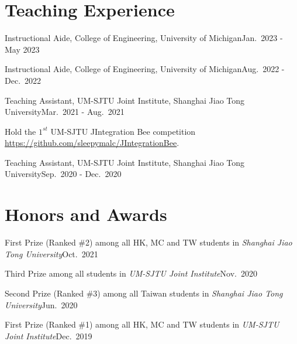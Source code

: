 \documentclass[letterpaper,10.8pt]{article}
\begin{document}
\section{Teaching Experience}
\begin{brief}
  \item {}
  {Instructional Aide, College of Engineering, University of Michigan}{Jan.\ 2023 - May 2023}

  \item {}
  {Instructional Aide, College of Engineering, University of Michigan}{Aug.\ 2022 - Dec.\ 2022}

  \item {}
  {Teaching Assistant, UM-SJTU Joint Institute, Shanghai Jiao Tong University}{Mar.\ 2021 - Aug.\ 2021}
  \begin{detail}
    \item {}
    {Hold the \(1^{st}\) UM-SJTU JIntegration Bee competition \url{https://github.com/sleepymalc/JIntegrationBee}.}
  \end{detail}

  \item {}
  {Teaching Assistant, UM-SJTU Joint Institute, Shanghai Jiao Tong University}{Sep.\ 2020 - Dec.\ 2020}
\end{brief}

\section{Honors and Awards}
\begin{brief}
  \item {}
  {First Prize (Ranked \#2) among all HK, MC and TW students in \emph{Shanghai Jiao Tong University}}{Oct.\ 2021}

  \item {}
  {Third Prize among all students in \emph{UM-SJTU Joint Institute}}{Nov.\ 2020}

  \item {}
  {Second Prize (Ranked \#3) among all Taiwan students in \emph{Shanghai Jiao Tong University}}{Jun.\ 2020}

  \item {}
  {First Prize (Ranked \#1) among all HK, MC and TW students in \emph{UM-SJTU Joint Institute}}{Dec.\ 2019}
\end{brief}
\end{document}
